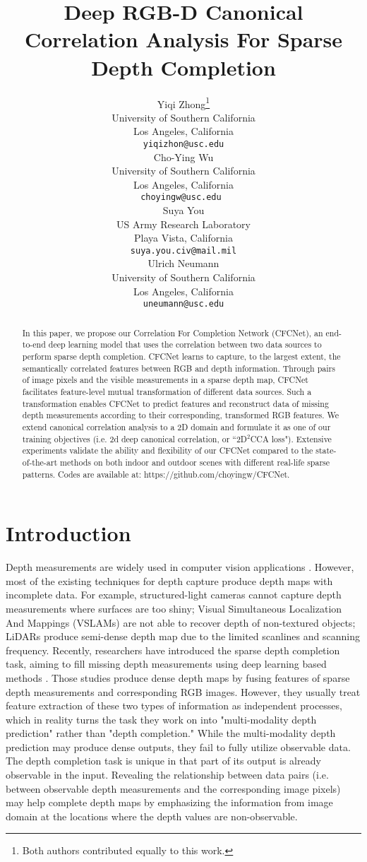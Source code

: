 \documentclass{article}
\title{Deep RGB-D Canonical Correlation Analysis For Sparse Depth Completion}
\author{Yiqi Zhong\thanks{Both authors contributed equally to this work.} \\
  University of Southern California\\
  Los Angeles, California \\
  \texttt{yiqizhon@usc.edu} \\
  \And
  Cho-Ying Wu\footnotemark[1]\\
  University of Southern California\\
  Los Angeles, California \\
  \texttt{choyingw@usc.edu } \\
  \And
  Suya You \\
  US Army Research Laboratory\\
  Playa Vista, California \\
  \texttt{suya.you.civ@mail.mil} \\
  \And
  Ulrich Neumann\\
  University of Southern California\\
  Los Angeles, California \\
  \texttt{uneumann@usc.edu} \\
}
\begin{document}
\maketitle

\begin{abstract}


In this paper, we propose our Correlation For Completion Network (CFCNet), an end-to-end deep learning model that uses the correlation between two data sources to perform sparse depth completion. CFCNet learns to capture, to the largest extent, the semantically correlated features between RGB and depth information. Through pairs of image pixels and the visible measurements in a sparse depth map, CFCNet facilitates feature-level mutual transformation of different data sources. Such a transformation enables CFCNet to predict features and reconstruct data of missing depth measurements according to their corresponding, transformed RGB features. We extend canonical correlation analysis to a 2D domain and formulate it as one of our training objectives (i.e. 2d deep canonical correlation, or “2D$^2$CCA loss"). Extensive experiments  validate the ability and flexibility of our CFCNet compared to the state-of-the-art methods on both indoor and outdoor scenes with different real-life sparse patterns. Codes are available at: https://github.com/choyingw/CFCNet.
\end{abstract}
\section{Introduction}

Depth measurements are widely used in computer vision applications \cite{tateno2017cnn,wang2018depth,NIPS2019_8340}. However, most of the existing techniques for depth capture produce depth maps with incomplete data. For example, structured-light cameras cannot capture depth measurements where surfaces are too shiny; Visual Simultaneous Localization And Mappings (VSLAMs) are not able to recover depth of non-textured objects; LiDARs produce semi-dense depth map due to the limited scanlines and scanning frequency. Recently, researchers have introduced the sparse depth completion task, aiming to fill missing depth measurements using deep learning based methods \cite{Ma2017SparseToDense,shivakumar2019dfusenet,uhrig2017sparsity,qiu2018deeplidar, chen2018estimating,yang2019dense,zhang2019dfinenet}. Those studies produce dense depth maps by fusing features of sparse depth measurements and corresponding RGB images. However, they usually treat feature extraction of these two types of information as independent processes, which in reality turns the task they work on into "multi-modality depth prediction" rather than "depth completion." While the multi-modality depth prediction may produce dense outputs, they fail to fully utilize observable data. The depth completion task is unique in that part of its output is already observable in the input. Revealing the relationship between data pairs (i.e. between observable depth measurements and the corresponding image pixels) may help complete depth maps by emphasizing the information from image domain at the locations where the depth values are non-observable.
\end{document}
